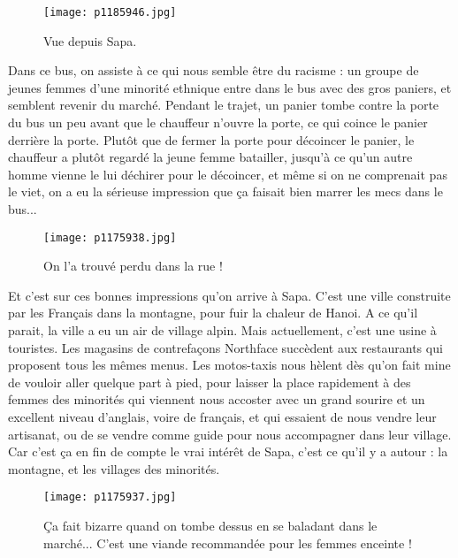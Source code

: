 \documentclass{book}
\begin{document}
\begin{figure}[h]
\centering
\texttt{[image: p1185946.jpg]}
\caption*{Vue depuis Sapa.}
\end{figure}

Dans ce bus, on assiste à ce qui nous semble être du racisme : un groupe de jeunes femmes d'une minorité ethnique entre dans le bus avec des gros paniers, et semblent revenir du marché. Pendant le trajet, un panier tombe contre la porte du bus un peu avant que le chauffeur n'ouvre la porte, ce qui coince le panier derrière la porte. Plutôt que de fermer la porte pour décoincer le panier, le chauffeur a plutôt regardé la jeune femme batailler, jusqu'à ce qu'un autre homme vienne le lui déchirer pour le décoincer, et même si on ne comprenait pas le viet, on a eu la sérieuse impression que ça faisait bien marrer les mecs dans le bus...


\begin{figure}[h]
\centering
\texttt{[image: p1175938.jpg]}
\caption*{On l'a trouvé perdu dans la rue !}
\end{figure}

Et c'est sur ces bonnes impressions qu'on arrive à Sapa. C'est une ville construite par les Français dans la montagne, pour fuir la chaleur de Hanoi. A ce qu'il parait, la ville a eu un air de village alpin. Mais actuellement, c'est une usine à touristes. Les magasins de contrefaçons Northface succèdent aux restaurants qui proposent tous les mêmes menus. Les motos-taxis nous hèlent dès qu'on fait mine de vouloir aller quelque part à pied, pour laisser la place rapidement à des femmes des minorités qui viennent nous accoster avec un grand sourire et un excellent niveau d'anglais, voire de français, et qui essaient de nous vendre leur artisanat, ou de se vendre comme guide pour nous accompagner dans leur village. Car c'est ça en fin de compte le vrai intérêt de Sapa, c'est ce qu'il y a autour : la montagne, et les villages des minorités.


\begin{figure}[h]
\centering
\texttt{[image: p1175937.jpg]}
\caption*{Ça fait bizarre quand on tombe dessus en se baladant dans le marché... C'est une viande recommandée pour les femmes enceinte !}
\end{figure}
\end{document}
